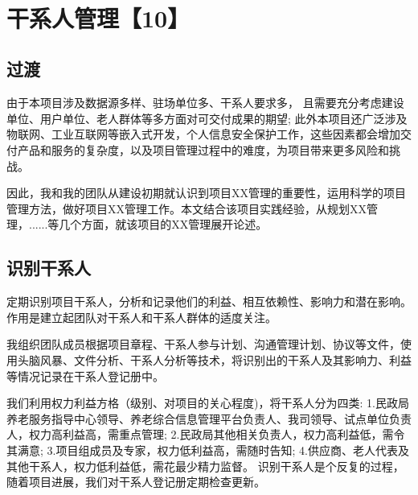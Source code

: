 \documentclass[UTF8]{../computerUniverse}
\begin{document}


\begin{lstlisting}


\end{lstlisting}




\chapter{干系人管理【10】}

\section{过渡}


由于本项目涉及数据源多样、驻场单位多、干系人要求多，
且需要充分考虑建设单位、用户单位、老人群体等多方面对可交付成果的期望;
此外本项目还广泛涉及物联网、工业互联网等嵌入式开发，个人信息安全保护工作，这些因素都会增加交付产品和服务的复杂度，以及项目管理过程中的难度，为项目带来更多风险和挑战。

因此，我和我的团队从建设初期就认识到项目XX管理的重要性，运用科学的项目管理方法，做好项目XX管理工作。本文结合该项目实践经验，从规划XX管理，......等几个方面，就该项目的XX管理展开论述。

\section{识别干系人}

定期识别项目干系人，分析和记录他们的利益、相互依赖性、影响力和潜在影响。
作用是建立起团队对干系人和干系人群体的适度关注。

我组织团队成员根据项目章程、干系人参与计划、沟通管理计划、协议等文件，使用头脑风暴、文件分析、干系人分析等技术，将识别出的干系人及其影响力、利益等情况记录在干系人登记册中。

我们利用权力利益方格（级别、对项目的关心程度)，将干系人分为四类:
1.民政局养老服务指导中心领导、养老综合信息管理平台负责人、我司领导、试点单位负责人，权力高利益高，需重点管理;
2.民政局其他相关负责人，权力高利益低，需令其满意;
3.项目组成员及专家，权力低利益高，需随时告知;
4.供应商、老人代表及其他干系人，权力低利益低，需花最少精力监督。
识别干系人是个反复的过程，随着项目进展，我们对干系人登记册定期检查更新。
\end{document}
